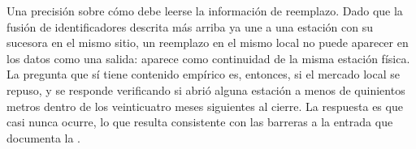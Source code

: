 Una precisión sobre cómo debe leerse la información de reemplazo. Dado que la
fusión de identificadores descrita más arriba ya une a una estación con su
sucesora en el mismo sitio, un reemplazo en el mismo local no puede aparecer en
los datos como una salida: aparece como continuidad de la misma estación
física. La pregunta que sí tiene contenido empírico es, entonces, si el mercado
local se repuso, y se responde verificando si abrió alguna estación a menos de
quinientos metros dentro de los veinticuatro meses siguientes al cierre. La
respuesta es que casi nunca ocurre, lo que resulta consistente con las barreras
a la entrada que documenta la \textcite{FNE2021informe}.
